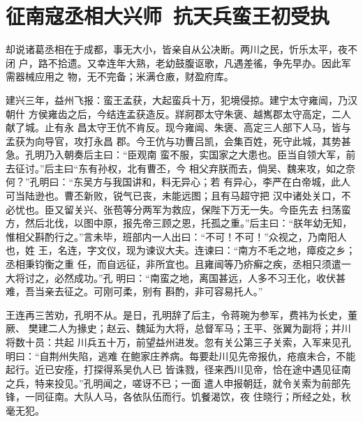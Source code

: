 \chapter{征南寇丞相大兴师~抗天兵蛮王初受执}

却说诸葛丞相在于成都，事无大小，皆亲自从公决断。两川之民，忻乐太平，夜不闭
户，路不拾遗。又幸连年大熟，老幼鼓腹讴歌，凡遇差徭，争先早办。因此军需器械应用之
物，无不完备；米满仓廒，财盈府库。

建兴三年，益州飞报：蛮王孟获，大起蛮兵十万，犯境侵掠。建宁太守雍闿，乃汉朝什
方侯雍齿之后，今结连孟获造反。牂牁郡太守朱褒、越嶲郡太守高定，二人献了城。止有永
昌太守王伉不肯反。现今雍闿、朱褒、高定三人部下人马，皆与孟获为向导官，攻打永昌
郡。今王伉与功曹吕凯，会集百姓，死守此城，其势甚急。孔明乃入朝奏后主曰：“臣观南
蛮不服，实国家之大患也。臣当自领大军，前去征讨。”后主曰“东有孙权，北有曹丕，今
相父弃朕而去，倘吴、魏来攻，如之奈何？”孔明曰：“东吴方与我国讲和，料无异心；若
有异心，李严在白帝城，此人可当陆逊也。曹丕新败，锐气已丧，未能远图；且有马超守把
汉中诸处关口，不必忧也。臣又留关兴、张苞等分两军为救应，保陛下万无一失。今臣先去
扫荡蛮方，然后北伐，以图中原，报先帝三顾之恩，托孤之重。”后主曰：“朕年幼无知，
惟相父斟酌行之。”言未毕，班部内一人出曰：“不可！不可！”众视之，乃南阳人也，姓
王，名连，字文仪，现为谏议大夫。连谏曰：“南方不毛之地，瘴疫之乡；丞相秉钧衡之重
任，而自远征，非所宜也。且雍闿等乃疥癣之疾，丞相只须遣一大将讨之，必然成功。”孔
明曰：“南蛮之地，离国甚远，人多不习王化，收伏甚难，吾当亲去征之。可刚可柔，别有
斟酌，非可容易托人。”

王连再三苦劝，孔明不从。是日，孔明辞了后主，令蒋琬为参军，费祎为长史，董厥、
樊建二人为掾史；赵云、魏延为大将，总督军马；王平、张翼为副将；并川将数十员：共起
川兵五十万，前望益州进发。忽有关公第三子关索，入军来见孔明曰：“自荆州失陷，逃难
在鲍家庄养病。每要赴川见先帝报仇，疮痕未合，不能起行。近已安痊，打探得系吴仇人已
皆诛戮，径来西川见帝，恰在途中遇见征南之兵，特来投见。”孔明闻之，嗟讶不已；一面
遣人申报朝廷，就令关索为前部先锋，一同征南。大队人马，各依队伍而行。饥餐渴饮，夜
住晓行；所经之处，秋毫无犯。

